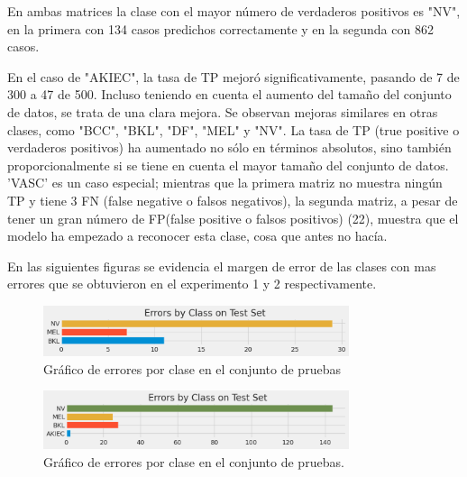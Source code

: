 En ambas matrices la clase con el mayor número de verdaderos positivos es "NV", en la primera con 134 casos predichos correctamente y en la segunda con 862 casos.

En el caso de "AKIEC", la tasa de TP mejoró significativamente, pasando de 7 de 300 a 47 de 500. Incluso teniendo en cuenta el aumento del tamaño del conjunto de datos, se trata de una clara mejora. Se observan mejoras similares en otras clases, como "BCC", "BKL", "DF", "MEL" y "NV". La tasa de TP (true positive o verdaderos positivos) ha aumentado no sólo en términos absolutos, sino también proporcionalmente si se tiene en cuenta el mayor tamaño del conjunto de datos. 'VASC' es un caso especial; mientras que la primera matriz no muestra ningún TP y tiene 3 FN (false negative o falsos negativos), la segunda matriz, a pesar de tener un gran número de FP(false positive o falsos positivos) (22), muestra que el modelo ha empezado a reconocer esta clase, cosa que antes no hacía.

En las siguientes figuras se evidencia el margen de error de las clases con mas errores que se obtuvieron en el experimento 1 y 2 respectivamente.

\begin{figure}[ht]%
    \begin{center}
        \includegraphics[width=0.8\textwidth]{./Graphics/errorByClass_p1.png}
        \caption{Gráfico de errores por clase en el conjunto de pruebas\label{fig:class_errors_p1}}
    \end{center}
\end{figure} 

\begin{figure}[ht]%
    \begin{center}
        \includegraphics[width=0.8\textwidth]{./Graphics/errorByClass_p3.png}
            \caption{Gráfico de errores por clase en el conjunto de pruebas.\label{fig:class_errors_p3}}
    \end{center}
\end{figure}

